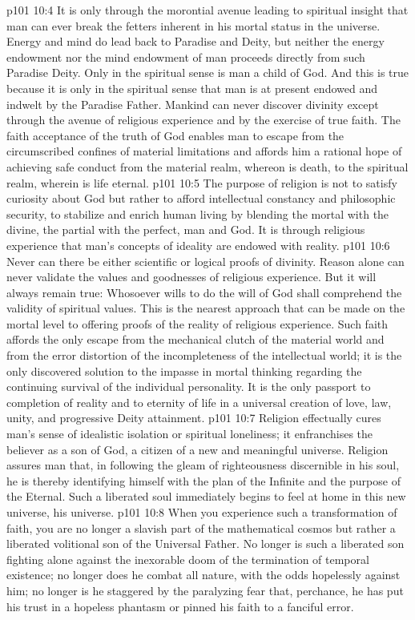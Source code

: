 \vs p101 10:4 It is only through the morontial avenue leading to spiritual insight that man can ever break the fetters inherent in his mortal status in the universe. Energy and mind do lead back to Paradise and Deity, but neither the energy endowment nor the mind endowment of man proceeds directly from such Paradise Deity. Only in the spiritual sense is man a child of God. And this is true because it is only in the spiritual sense that man is at present endowed and indwelt by the Paradise Father. Mankind can never discover divinity except through the avenue of religious experience and by the exercise of true faith. The faith acceptance of the truth of God enables man to escape from the circumscribed confines of material limitations and affords him a rational hope of achieving safe conduct from the material realm, whereon is death, to the spiritual realm, wherein is life eternal.
\pc \vs p101 10:5 The purpose of religion is not to satisfy curiosity about God but rather to afford intellectual constancy and philosophic security, to stabilize and enrich human living by blending the mortal with the divine, the partial with the perfect, man and God. It is through religious experience that man’s concepts of ideality are endowed with reality.
\pc \vs p101 10:6 Never can there be either scientific or logical proofs of divinity. Reason alone can never validate the values and goodnesses of religious experience. But it will always remain true: Whosoever wills to do the will of God shall comprehend the validity of spiritual values. This is the nearest approach that can be made on the mortal level to offering proofs of the reality of religious experience. Such faith affords the only escape from the mechanical clutch of the material world and from the error distortion of the incompleteness of the intellectual world; it is the only discovered solution to the impasse in mortal thinking regarding the continuing survival of the individual personality. It is the only passport to completion of reality and to eternity of life in a universal creation of love, law, unity, and progressive Deity attainment.
\vs p101 10:7 Religion effectually cures man’s sense of idealistic isolation or spiritual loneliness; it enfranchises the believer as a son of God, a citizen of a new and meaningful universe. Religion assures man that, in following the gleam of righteousness discernible in his soul, he is thereby identifying himself with the plan of the Infinite and the purpose of the Eternal. Such a liberated soul immediately begins to feel at home in this new universe, his universe.
\vs p101 10:8 When you experience such a transformation of faith, you are no longer a slavish part of the mathematical cosmos but rather a liberated volitional son of the Universal Father. No longer is such a liberated son fighting alone against the inexorable doom of the termination of temporal existence; no longer does he combat all nature, with the odds hopelessly against him; no longer is he staggered by the paralyzing fear that, perchance, he has put his trust in a hopeless phantasm or pinned his faith to a fanciful error.
